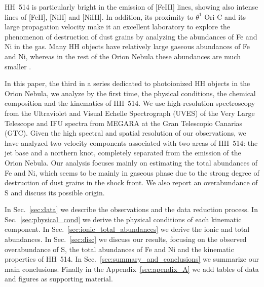 \documentclass[fleqn,usenatbib]{mnras}
\begin{document}
HH~514 is particularly bright in the emission of [Fe\thinspace III] lines, showing also intense lines of  [Fe\thinspace II], [Ni\thinspace II] and [Ni\thinspace III]. In addition, its proximity to $\theta^1$ Ori C and its large propagation velocity make it an excellent laboratory to explore the phenomenon of destruction of dust grains by analyzing the abundances of Fe and Ni in the gas.
Many HH objects have relatively large gaseous abundances of Fe and Ni,
whereas in the rest of the Orion Nebula these abundances are much smaller \citep[][]{mendez2021-2}.

In this paper, the third in a series dedicated to photoionized HH objects in the Orion Nebula, we analyze by the first time, the physical conditions, the chemical composition and the kinematics of HH~514. We use high-resolution spectroscopy from the Ultraviolet and Visual Echelle Spectrograph (UVES) \citep[][]{Dodorico00} of the Very Large Telescope and IFU spectra from MEGARA \citep{gildepaz+18} at the Gran Telescopio Canarias (GTC). Given the high spectral and spatial resolution of our observations, we have analyzed two velocity components associated with two areas of HH~514: the jet base and a northern knot, completely separated from the emission of the Orion Nebula. Our analysis focuses mainly on estimating the total abundances of Fe and Ni, which seems to be mainly in gaseous phase due to the strong degree of destruction of dust grains in the shock front. We also report an overabundance of S and discuss its possible origin.

In Sec.~\ref{sec:data} we describe the observations and the data reduction process. In Sec.~\ref{sec:physical_cond} we derive the physical conditions of each kinematic component. In Sec.~\ref{sec:ionic_total_abundances} we derive the ionic and total abundances. In Sec.~\ref{sec:disc} we discuss our results, focusing on the observed overabundance of S, the total abundances of Fe and Ni and the kinematic properties of HH~514. In Sec.~\ref{sec:summary_and_conclusions} we summarize our main conclusions. Finally in the Appendix~\ref{sec:apendix_A} we add tables of data
and figures as supporting material.
\end{document}
